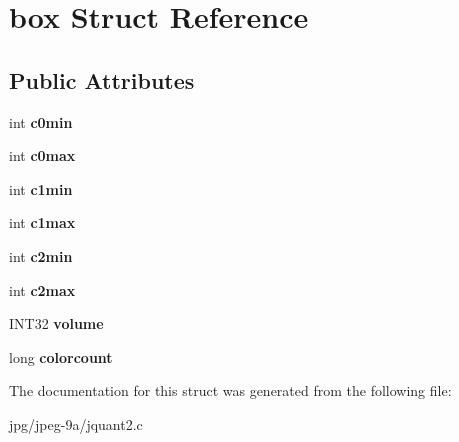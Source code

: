\hypertarget{structbox}{\section{box Struct Reference}
\label{structbox}
}
\subsection*{Public Attributes}
\begin{DoxyCompactItemize}
\item 
\hypertarget{structbox_acf78968f99d9730f516003fc77a60f07}{int {\bfseries c0min}}\label{structbox_acf78968f99d9730f516003fc77a60f07}

\item 
\hypertarget{structbox_a9a9cb397dbffdd1b17cc670834e3fb4d}{int {\bfseries c0max}}\label{structbox_a9a9cb397dbffdd1b17cc670834e3fb4d}

\item 
\hypertarget{structbox_a81563b63e4a79ca40bdfeacf5070a6d9}{int {\bfseries c1min}}\label{structbox_a81563b63e4a79ca40bdfeacf5070a6d9}

\item 
\hypertarget{structbox_a5313694dbee838c7f4d5f409e954460e}{int {\bfseries c1max}}\label{structbox_a5313694dbee838c7f4d5f409e954460e}

\item 
\hypertarget{structbox_a781a101c49c5e4a789967569994d924d}{int {\bfseries c2min}}\label{structbox_a781a101c49c5e4a789967569994d924d}

\item 
\hypertarget{structbox_a1fe5b5ab81ed7e8e3f104deb168576cd}{int {\bfseries c2max}}\label{structbox_a1fe5b5ab81ed7e8e3f104deb168576cd}

\item 
\hypertarget{structbox_acaba83fb8356e20d21793c23c41033a1}{I\+N\+T32 {\bfseries volume}}\label{structbox_acaba83fb8356e20d21793c23c41033a1}

\item 
\hypertarget{structbox_af92a3080724bf452855f631e901b803c}{long {\bfseries colorcount}}\label{structbox_af92a3080724bf452855f631e901b803c}

\end{DoxyCompactItemize}


The documentation for this struct was generated from the following file\+:\begin{DoxyCompactItemize}
\item 
jpg/jpeg-\/9a/jquant2.\+c\end{DoxyCompactItemize}
